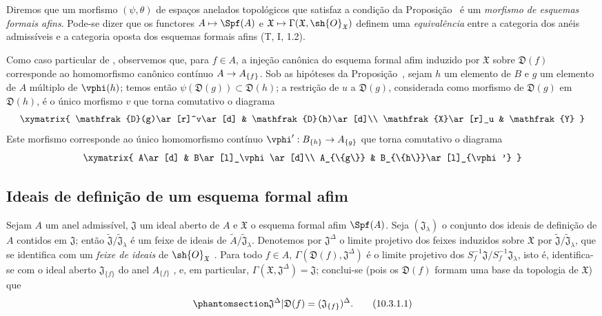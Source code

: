 \documentclass[oneside]{amsart}
\makeatletter
\newcommand{\ega@arrow}[2]{\mathchoice{#1}{#2}{#2}{#2}}
\let\ega@shortmapsto\mapsto
\renewcommand{\to}{\ega@arrow{\longrightarrow}{\rightarrow}}
\renewcommand{\mapsto}{\ega@arrow{\longmapsto}{\ega@shortmapsto}}
\let\EGAOriginalLabel\label
\renewcommand{\label}[1]{\phantomsection\EGAOriginalLabel{#1}}
\makeatother
\begin{document}
Diremos que um morfismo $(\psi,\theta)$ de espaços anelados topológicos que satisfaz a condição da Proposição~ é um \emph{morfismo de esquemas formais afins}. Pode-se dizer que os functores $A\mapsto\Spf(A)$ e $\mathfrak{X}\mapsto\Gamma(\mathfrak{X},\sh{O}_\mathfrak{X})$ definem uma \emph{equivalência} entre a categoria dos anéis admissíveis e a categoria oposta dos esquemas formais afins (T, I, 1.2).

\begin{env}[10.2.3]
\label{I.10.2.3}
Como caso particular de , observemos que, para $f\in A$, a injeção canônica do esquema formal afim induzido por $\mathfrak{X}$ sobre $\mathfrak{D}(f)$ corresponde ao homomorfismo canônico contínuo $A\to A_{\{f\}}$.
Sob as hipóteses da Proposição~, sejam $h$ um elemento de $B$ e $g$ um elemento de $A$ múltiplo de $\vphi(h)$;
temos então $\psi(\mathfrak{D}(g))\subset\mathfrak{D}(h)$; a restrição de $u$ a $\mathfrak{D}(g)$, considerada como morfismo de $\mathfrak{D}(g)$ em $\mathfrak{D}(h)$, é o único morfismo $v$ que torna comutativo o diagrama
\[
  \xymatrix{
    \mathfrak{D}(g)\ar[r]^v\ar[d] &
    \mathfrak{D}(h)\ar[d]\\
    \mathfrak{X}\ar[r]_u &
    \mathfrak{Y}
  }
\]
Este morfismo corresponde ao único homomorfismo contínuo $\vphi':B_{\{h\}}\to A_{\{g\}}$  que torna comutativo o diagrama
\[
  \xymatrix{
    A\ar[d] &
    B\ar[l]_\vphi\ar[d]\\
    A_{\{g\}} &
    B_{\{h\}}\ar[l]_{\vphi'}
  }
\]
\end{env}

\subsection{Ideais de definição de um esquema formal afim}
\label{subsection:I.10.3}

\begin{env}[10.3.1]
\label{I.10.3.1}
Sejam $A$ um anel admissível, $\mathfrak{J}$ um ideal aberto de $A$ e $\mathfrak{X}$ o esquema formal afim $\Spf(A)$.
Seja $(\mathfrak{J}_\lambda)$ o conjunto dos ideais de definição de $A$ contidos em $\mathfrak{J}$; então $\widetilde{\mathfrak{J}}/\widetilde{\mathfrak{J}}_\lambda$ é um feixe de ideais de $\widetilde{A}/\widetilde{\mathfrak{J}}_\lambda$.
Denotemos por $\mathfrak{J}^\Delta$ o limite projetivo dos feixes induzidos sobre $\mathfrak{X}$ por $\widetilde{\mathfrak{J}}/\widetilde{\mathfrak{J}}_\lambda$, que se identifica com um \emph{feixe de ideais} de $\sh{O}_\mathfrak{X}$ .
Para todo $f\in A$, $\Gamma(\mathfrak{D}(f),\mathfrak{J}^\Delta)$ é o limite projetivo dos $S_f^{-1}\mathfrak{J}/S_f^{-1}\mathfrak{J}_\lambda$, isto é, identifica-se com o ideal aberto $\mathfrak{J}_{\{f\}}$ do anel $A_{\{f\}}$ , e, em particular, $\Gamma(\mathfrak{X},\mathfrak{J}^\Delta)=\mathfrak{J}$; conclui-se (pois os $\mathfrak{D}(f)$ formam uma base da topologia de $\mathfrak{X}$) que
\[
\label{I.10.3.1.1}
  \mathfrak{J}^\Delta|\mathfrak{D}(f)=(\mathfrak{J}_{\{f\}})^\Delta.
  \tag{10.3.1.1}
\]
\end{env}
\end{document}

